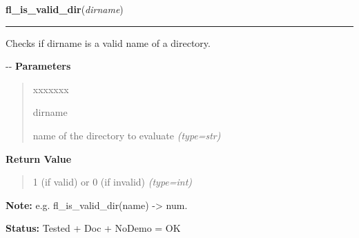     \label{xformslib:flfilesys:fl_is_valid_dir}

    \vspace{0.5ex}

\hspace{.8\funcindent}\begin{boxedminipage}{\funcwidth}

    \raggedright \textbf{fl\_is\_valid\_dir}(\textit{dirname})

    \vspace{-1.5ex}

    \rule{\textwidth}{0.5\fboxrule}
\setlength{\parskip}{2ex}

Checks if dirname is a valid name of a directory.

-{}-
\setlength{\parskip}{1ex}
      \textbf{Parameters}
      \vspace{-1ex}

      \begin{quote}
        \begin{Ventry}{xxxxxxx}

          \item[dirname]


name of the directory to evaluate
            {\it (type=str)}

        \end{Ventry}

      \end{quote}

      \textbf{Return Value}
    \vspace{-1ex}

      \begin{quote}

1 (if valid) or 0 (if invalid)
      {\it (type=int)}

      \end{quote}

\textbf{Note:} 
e.g. fl\_is\_valid\_dir(name) -> num.


\textbf{Status:} 
Tested + Doc + NoDemo = OK


    \end{boxedminipage}

    \label{xformslib:flfilesys:fl_fmtime}

    \vspace{0.5ex}

